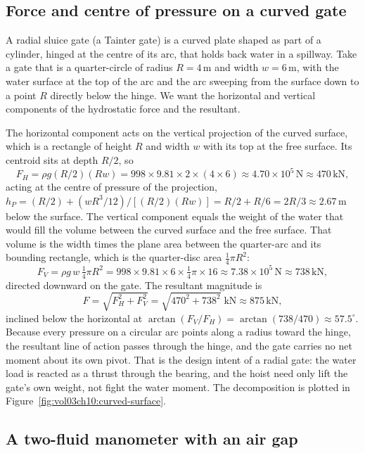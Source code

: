 \subsection{Force and centre of pressure on a curved gate}

A radial sluice gate (a Tainter gate) is a curved plate shaped as part
of a cylinder, hinged at the centre of its arc, that holds back water in
a spillway. Take a gate that is a quarter-circle of radius $R = 4\,\si{
\meter}$ and width $w = 6\,\si{\meter}$, with the water surface at the
top of the arc and the arc sweeping from the surface down to a point
$R$ directly below the hinge. We want the horizontal and vertical
components of the hydrostatic force and the resultant.

The horizontal component acts on the vertical projection of the curved
surface, which is a rectangle of height $R$ and width $w$ with its top
at the free surface. Its centroid sits at depth $R/2$, so
\[
F_H = \rho g (R/2)(R w)
= 998 \times 9.81 \times 2 \times (4 \times 6)
\approx 4.70 \times 10^5\,\text{N}
\approx 470\,\text{kN},
\]
acting at the centre of pressure of the projection, $h_P = (R/2) +
(wR^3/12)/[(R/2)(Rw)] = R/2 + R/6 = 2R/3 \approx 2.67\,\si{\meter}$ below
the surface. The vertical component equals the weight of the water that
would fill the volume between the curved surface and the free surface.
That volume is the width times the plane area between the quarter-arc and
its bounding rectangle, which is the quarter-disc area $\tfrac14\pi R^2$:
\[
F_V = \rho g\, w\, \tfrac14 \pi R^2
= 998 \times 9.81 \times 6 \times \tfrac14 \pi \times 16
\approx 7.38 \times 10^5\,\text{N}
\approx 738\,\text{kN},
\]
directed downward on the gate. The resultant magnitude is
\[
F = \sqrt{F_H^2 + F_V^2}
= \sqrt{470^2 + 738^2}\;\text{kN}
\approx 875\,\text{kN},
\]
inclined below the horizontal at $\arctan(F_V/F_H) = \arctan(738/470)
\approx 57.5^{\circ}$. Because every pressure on a circular arc points
along a radius toward the hinge, the resultant line of action passes
through the hinge, and the gate carries no net moment about its own
pivot. That is the design intent of a radial gate: the water load is
reacted as a thrust through the bearing, and the hoist need only lift the
gate's own weight, not fight the water moment. The decomposition is
plotted in Figure~\ref{fig:vol03ch10:curved-surface}.



\subsection{A two-fluid manometer with an air gap}

